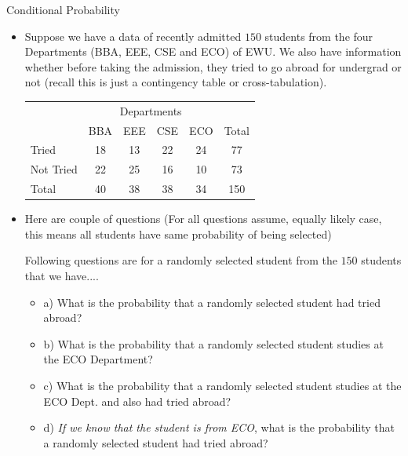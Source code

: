 \documentclass[8pt, usepdftitle = false]{beamer}
\begin{document}
\begin{frame}[allowframebreaks]{Conditional Probability}
\begin{itemize}
\item Suppose we have a data of recently admitted $150$ students from the four Departments (BBA, EEE, CSE and ECO) of EWU. We also have information whether before taking the admission, they tried to go abroad for undergrad or not (recall this is just a contingency table or cross-tabulation). 

\medskip

\begin{table}
\centering
\begin{tabular}{|lccccc|}
\hline & \multicolumn{4}{c}{ Departments } & \\
\cline { 2 - 6 }  & BBA & EEE & CSE & ECO & Total \\
\hline Tried & 18 & 13 & 22 & 24 & 77 \\
Not Tried & 22 & 25 & 16 & 10 & 73 \\
\hline Total & 40 & 38 & 38 & 34 & 150 \\
\hline
\end{tabular}
\end{table}

\framebreak



\item Here are couple of questions (For all questions assume, equally likely case, this means all students have same probability of being selected)

\medskip

Following questions are for a randomly selected student from the $150$ students that we have....

\medskip

\begin{itemize}
\item a) What is the probability that a randomly selected student had tried abroad?

\medskip

\item b) What is the probability that a randomly selected student studies at the ECO Department?

\medskip

\item c) What is the probability that a randomly selected student studies at the ECO Dept. and also had tried abroad?

\medskip

\item d) \emph{If we know that the student is from ECO}, what is the probability that a randomly selected student had tried abroad? 


\end{itemize}
\end{itemize}
\end{frame}
\end{document}
